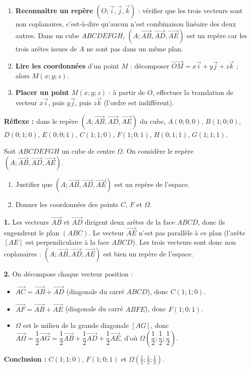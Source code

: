 \documentclass[11pt]{article}
\newcommand{\cle}[1]{{\popxbold\color{popdark}#1}}
\begin{document}
\begin{methode}
\begin{enumerate}
\item \textbf{Reconnaître un repère} $(O;\vec{i},\vec{j},\vec{k})$ : vérifier que les trois vecteurs sont \cle{non coplanaires}, c'est-à-dire qu'aucun n'est combinaison linéaire des deux autres. Dans un cube $ABCDEFGH$, $(A;\overrightarrow{AB},\overrightarrow{AD},\overrightarrow{AE})$ est un repère car les trois arêtes issues de $A$ ne sont pas dans un même plan.
\item \textbf{Lire les coordonnées} d'un point $M$ : décomposer $\overrightarrow{OM}=x\vec{i}+y\vec{j}+z\vec{k}$ ; alors $M(x;y;z)$.
\item \textbf{Placer un point} $M(x;y;z)$ : à partir de $O$, effectuer la translation de vecteur $x\vec{i}$, puis $y\vec{j}$, puis $z\vec{k}$ (l'ordre est indifférent).
\end{enumerate}
\textbf{Réflexe :} dans le repère $(A;\overrightarrow{AB},\overrightarrow{AD},\overrightarrow{AE})$ du cube, $A(0;0;0)$, $B(1;0;0)$, $D(0;1;0)$, $E(0;0;1)$, $C(1;1;0)$, $F(1;0;1)$, $H(0;1;1)$, $G(1;1;1)$.
\end{methode}

\begin{exoresolu}
Soit $ABCDEFGH$ un cube de centre $\Omega$. On considère le repère $(A;\overrightarrow{AB},\overrightarrow{AD},\overrightarrow{AE})$.
\begin{enumerate}
\item Justifier que $(A;\overrightarrow{AB},\overrightarrow{AD},\overrightarrow{AE})$ est un repère de l'espace.
\item Donner les coordonnées des points $C$, $F$ et $\Omega$.
\end{enumerate}
\tcblower
\textbf{1.} Les vecteurs $\overrightarrow{AB}$ et $\overrightarrow{AD}$ dirigent deux arêtes de la face $ABCD$, donc ils engendrent le plan $(ABC)$. Le vecteur $\overrightarrow{AE}$ n'est pas parallèle à ce plan (l'arête $[AE]$ est perpendiculaire à la face $ABCD$). Les trois vecteurs sont donc non coplanaires : $(A;\overrightarrow{AB},\overrightarrow{AD},\overrightarrow{AE})$ est bien un \cle{repère de l'espace}.

\textbf{2.} On décompose chaque vecteur position :
\begin{itemize}
\item $\overrightarrow{AC}=\overrightarrow{AB}+\overrightarrow{AD}$ (diagonale du carré $ABCD$), donc $C(1;1;0)$.
\item $\overrightarrow{AF}=\overrightarrow{AB}+\overrightarrow{AE}$ (diagonale du carré $ABFE$), donc $F(1;0;1)$.
\item $\Omega$ est le milieu de la grande diagonale $[AG]$, donc $\overrightarrow{A\Omega}=\dfrac{1}{2}\overrightarrow{AG}=\dfrac{1}{2}\overrightarrow{AB}+\dfrac{1}{2}\overrightarrow{AD}+\dfrac{1}{2}\overrightarrow{AE}$, d'où $\Omega\left(\dfrac{1}{2};\dfrac{1}{2};\dfrac{1}{2}\right)$.
\end{itemize}
\textbf{Conclusion :} $C(1;1;0)$, $F(1;0;1)$ et $\Omega\left(\frac{1}{2};\frac{1}{2};\frac{1}{2}\right)$.
\end{exoresolu}
\end{document}
